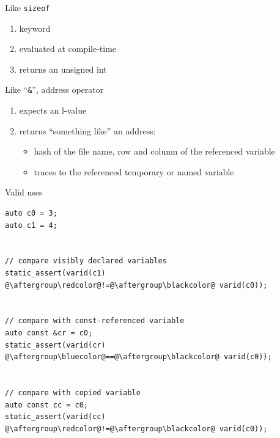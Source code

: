 \documentclass[xcolor=dvipsnames]{beamer}
\begin{document}
\begin{frame}[fragile]{Like \texttt{sizeof}}
  \begin{enumerate}
  \item keyword \vspace{5mm}
  \item evaluated at compile-time \vspace{5mm}
  \item returns an unsigned int \vspace{5mm}
  \end{enumerate}
\end{frame}


\begin{frame}[fragile]{Like ``\texttt{\&}'', address operator}
  \begin{enumerate}
  \item expects an l-value \vspace{5mm}
  \item returns ``something like'' an address: \vspace{5mm}
    \begin{itemize}
    \item hash of the {\color{blue}file name, row and column} of the referenced variable \vspace{5mm}
    \item traces to the referenced temporary or named variable \vspace{5mm}
    \end{itemize}
  \end{enumerate}
\end{frame}


\begin{frame}[fragile]{Valid uses}
\begin{lstlisting}
auto c0 = 3;
auto c1 = 4;


// compare visibly declared variables
static_assert(varid(c1) @\aftergroup\redcolor@!=@\aftergroup\blackcolor@ varid(c0));


// compare with const-referenced variable
auto const &cr = c0;
static_assert(varid(cr) @\aftergroup\bluecolor@==@\aftergroup\blackcolor@ varid(c0));


// compare with copied variable
auto const cc = c0;
static_assert(varid(cc) @\aftergroup\redcolor@!=@\aftergroup\blackcolor@ varid(c0));
\end{lstlisting}
\end{frame}
\end{document}
